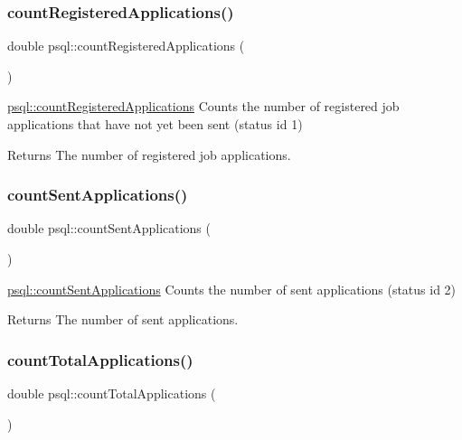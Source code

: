 \subsubsection{\texorpdfstring{count\+Registered\+Applications()}{countRegisteredApplications()}}
{\footnotesize\ttfamily double psql\+::count\+Registered\+Applications (\begin{DoxyParamCaption}{ }\end{DoxyParamCaption})}



\mbox{\hyperlink{classpsql_a8673a80968d293cd3ead6e6e9da8dd8a}{psql\+::count\+Registered\+Applications}} Counts the number of registered job applications that have not yet been sent (status id 1) 

\begin{DoxyReturn}{Returns}
The number of registered job applications. 
\end{DoxyReturn}
\mbox{\label{classpsql_af5e6768f6c51ac7b94571505f7a628e4}} 
\subsubsection{\texorpdfstring{count\+Sent\+Applications()}{countSentApplications()}}
{\footnotesize\ttfamily double psql\+::count\+Sent\+Applications (\begin{DoxyParamCaption}{ }\end{DoxyParamCaption})}



\mbox{\hyperlink{classpsql_af5e6768f6c51ac7b94571505f7a628e4}{psql\+::count\+Sent\+Applications}} Counts the number of sent applications (status id 2) 

\begin{DoxyReturn}{Returns}
The number of sent applications. 
\end{DoxyReturn}
\mbox{\label{classpsql_a496d0a426a1539bf9babd1dd4e9fcd96}} 
\subsubsection{\texorpdfstring{count\+Total\+Applications()}{countTotalApplications()}}
{\footnotesize\ttfamily double psql\+::count\+Total\+Applications (\begin{DoxyParamCaption}{ }\end{DoxyParamCaption})}



